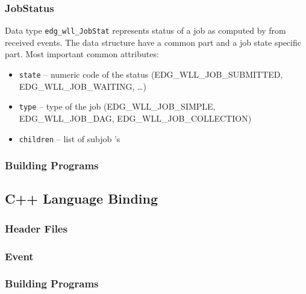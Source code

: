 \subsubsection{JobStatus}
Data type \texttt{edg\_wll\_JobStat} represents status of a job as
computed by \LB from received events. The data structure have a common
part and a job state specific part. Most important common
attributes:
\begin{itemize}
  \item \texttt{state} -- numeric code of the status
    (EDG\_WLL\_JOB\_SUBMITTED, EDG\_WLL\_JOB\_WAITING, \dots)
  \item \texttt{type} -- type of the job (EDG\_WLL\_JOB\_SIMPLE,
    EDG\_WLL\_JOB\_DAG, EDG\_WLL\_JOB\_COLLECTION) 
  \item \texttt{children} -- list of subjob \jobid's
\end{itemize}

\subsubsection{Building Programs}

\subsection{C++ Language Binding}
%

%

\subsubsection{Header Files}
\subsubsection{Event}
\subsubsection{Building Programs}